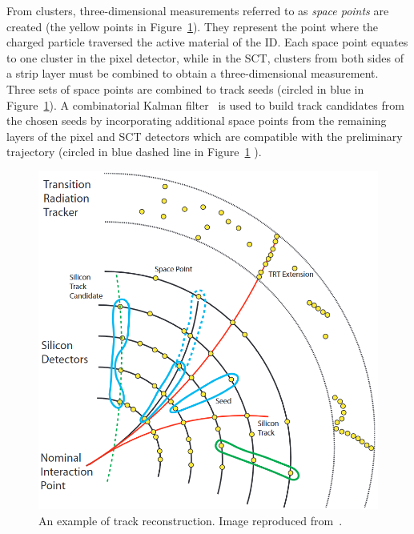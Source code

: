From clusters, three-dimensional measurements referred to as
\textit{space points} are created (the yellow points in Figure~\ref{fig:track_recon}). 
They represent the point where the charged particle 
traversed the active material of the ID. 
Each space point equates to one cluster in the pixel detector, while in the SCT, 
clusters from both sides of a strip layer must be combined to obtain a three-dimensional measurement.
Three sets of space points are combined to track seeds 
(circled in blue in Figure~\ref{fig:track_recon}). 
A combinatorial Kalman filter~\cite{FRUHWIRTH1987444} is used to 
build track candidates from the chosen seeds by incorporating additional 
space points from the remaining layers of the pixel and SCT detectors which 
are compatible with the preliminary trajectory 
(circled in blue dashed line in Figure~\ref{fig:track_recon} ). 
\begin{figure}[bht]
    \begin{centering}	
    \includegraphics[width=.8\textwidth]{Reconstruction_plots/track.png}
    \caption{An example of track reconstruction. Image reproduced from~\cite{ATLAS-CONF-2010-072}.
        }
    \label{fig:track_recon}
    \end{centering}
\end{figure}
